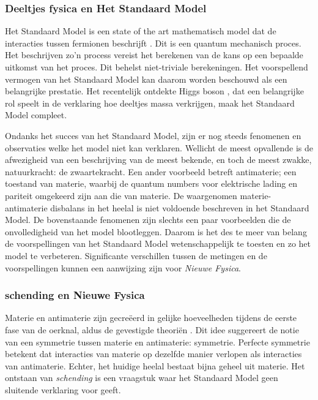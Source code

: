 \subsubsection{Deeltjes fysica en Het Standaard Model}
Het Standaard Model is een state of the art mathematisch model dat de interacties tussen fermionen beschrijft \cite{sm-glashow,sm-weinberg,sm-salam}. Dit is een quantum mechanisch proces. Het beschrijven zo'n process vereist het berekenen van de kans op een bepaalde uitkomst van het proces. Dit behelst niet-triviale berekeningen. Het voorspellend vermogen van het Standaard Model kan daarom worden beschouwd als een belangrijke prestatie. Het recentelijk ontdekte Higgs boson \cite{higgs-cms,higgs-atlas}, dat een belangrijke rol speelt in de verklaring hoe deeltjes massa verkrijgen, maak het Standaard Model compleet.


Ondanks het succes van het Standaard Model, zijn er nog steeds fenomenen en observaties welke het model niet kan verklaren. Wellicht de meest opvallende is de afwezigheid van een beschrijving van de meest bekende, en toch de meest zwakke, natuurkracht: de zwaartekracht. Een ander voorbeeld betreft antimaterie; een toestand van materie, waarbij de quantum numbers voor elektrische lading en pariteit omgekeerd zijn aan die van materie. De waargenomen materie-antimaterie disbalans in het heelal \cite{more-cpv-huet,more-cpv-gavela_I,more-cpv-gavela_II} is niet voldoende beschreven in het Standaard Model. De bovenstaande fenomenen zijn slechts een paar voorbeelden die de onvolledigheid van het model blootleggen. Daarom is het des te meer van belang de voorspellingen van het Standaard Model wetenschappelijk te toesten en zo het model te verbeteren. Significante verschillen tussen de metingen en de voorspellingen kunnen een aanwijzing zijn voor {\it Nieuwe Fysica}.



\subsubsection{\CP schending en Nieuwe Fysica}
Materie en antimaterie zijn gecre\"eerd in gelijke hoeveelheden tijdens de eerste fase van de oerknal, aldus de gevestigde theori\"en \cite{more-cpv-huet,more-cpv-gavela_I,more-cpv-gavela_II}. Dit idee suggereert de notie van een symmetrie tussen materie en antimaterie: \CP symmetrie. Perfecte \CP symmetrie betekent dat interacties van materie op dezelfde manier verlopen als interacties van antimaterie. Echter, het huidige heelal bestaat bijna geheel uit materie. Het ontstaan van  {\it \CP schending} is een vraagstuk waar het Standaard Model geen sluitende verklaring voor geeft.



